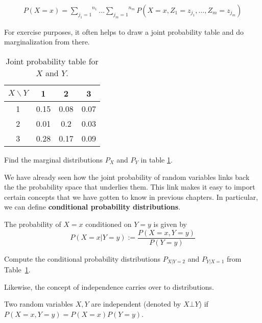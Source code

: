 \documentclass[a4paper,11pt,leqno]{report}
\begin{document}
\begin{align}
P(X=x) = \overset{n_{1}}{\underset{j_{1}=1}{\sum}}\ldots \overset{n_{m}}{\underset{j_{m}=1}{\sum}} 
P(X=x,Z_{1}=z_{j_{1}}, \ldots, Z_{m}=z_{j_{m}})
\end{align}

For exercise purposes, it often helps to draw a joint probability table and do marginalization from there.

\begin{table}
\center
\begin{tabular}{|c|c|c|c|}
\hline
$X\backslash Y$	& 1		& 2		& 3		\\
\hline
1				& 0.15	& 0.08	& 0.07	\\
2				& 0.01	& 0.2	& 0.03	\\	
3				& 0.28	& 0.17	& 0.09	\\
\hline
\end{tabular}
\caption{Joint probability table for $ X $ and $ Y $.}
\label{jointTable}
\end{table}

\begin{Exercise}
Find the marginal distributions $ P_X $ and $ P_{Y} $ in table \ref{jointTable}.
\end{Exercise}

We have already seen how the joint probability of random variables links back the the probability space that underlies them.
This link makes it easy to import certain concepts that we have
gotten to know in previous chapters. In particular, we can define \textbf{conditional probability distributions}.

\begin{Definition}
The probability of $ X = x $ conditioned on $ Y=y $ is given by
$$ P(X=x|Y=y) := \dfrac{P(X=x, Y=y)}{P(Y=y)} $$
\end{Definition} 

\begin{Exercise}
Compute the conditional probability distributions $ P_{X|Y=2} $ and $ P_{Y|X=1} $ from Table~\ref{jointTable}.
\end{Exercise}

Likewise, the concept of independence carries over to distributions.

\begin{Definition}
Two random variables $ X,Y $ are independent (denoted by $ X \bot Y $) if $ P(X=x, Y=y) = P(X=x)P(Y=y) $.
\end{Definition}
\end{document}
